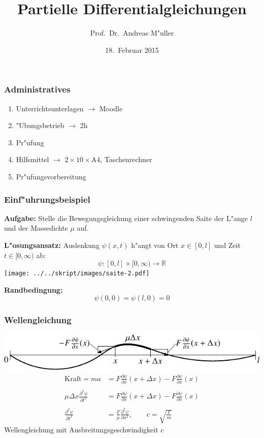 \documentclass{beamer}
\title[]{Partielle Differentialgleichungen}
\date[18.~Februar 2015]{18.~Februar 2015}
\author{Prof.~Dr.~Andreas M"uller}
\begin{document}
\begin{frame}
\titlepage
\end{frame}

\begin{frame}
\frametitle{Administratives}
\begin{enumerate}
\item Unterrichtsunterlagen $\to$ Moodle
\item "Ubungsbetrieb $\to$ 2h
\item Pr"ufung
\item Hilfsmittel $\to$ $2\times 10\times \text{A4}$, Taschenrechner
\item Pr"ufungsvorbereitung
\end{enumerate}
\end{frame}

\begin{frame}
\frametitle{Einf"uhrungsbeispiel}

{\bf Aufgabe:} Stelle die Bewegungsgleichung
einer schwingenden Saite der L"ange $l$ und der Massedichte $\mu$ auf.

\medskip
\pause
{\bf L"osungsansatz:}
Auslenkung $\psi(x,t)$ h"angt von Ort $x\in[0,l]$ und Zeit $t\in[0,\infty)$
ab:
\[
\psi\colon [0,l]\times [0,\infty)\to \mathbb R
\]
\pause
\medskip
\texttt{[image: ../../skript/images/saite-2.pdf]}
\pause
\medskip

{\bf Randbedingung:}
\[
\psi(0,0)=\psi(l,0)=0
\]
\end{frame}


\begin{frame}
\frametitle{Wellengleichung}
\includegraphics{../../skript/images/saite-1.pdf}
\begin{align*}
\text{Kraft}
=ma
&=
F\frac{\partial\psi}{\partial x}(x+\Delta x)-F\frac{\partial\psi}{\partial x}(x)
\\
\\
\mu \Delta x \frac{\partial^2 \psi}{\partial t^2}
&=
F\frac{\partial\psi}{\partial x}(x+\Delta x)-F\frac{\partial\psi}{\partial x}(x)
\\
\\
\frac{\partial^2 \psi}{\partial t^2}
&=
\frac{F}{\mu}
\frac{\partial^2\psi}{\partial x^2},
\qquad
c=\sqrt{\frac{F}{m}}
\end{align*}
Wellengleichung mit Ausbreitungsgeschwindigkeit $c$
\end{frame}
\end{document}
